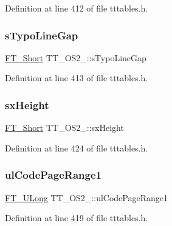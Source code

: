 Definition at line 412 of file tttables.\+h.

\mbox{\label{struct_t_t___o_s2___a55167834ee506be7c7208c5df7b5a91f}} 
\subsubsection{\texorpdfstring{sTypoLineGap}{sTypoLineGap}}
{\footnotesize\ttfamily \mbox{\hyperlink{fttypes_8h_aa7279be89046a2563cd3d4d6651fbdcf}{F\+T\+\_\+\+Short}} T\+T\+\_\+\+O\+S2\+\_\+\+::s\+Typo\+Line\+Gap}



Definition at line 413 of file tttables.\+h.

\mbox{\label{struct_t_t___o_s2___a2eb3bb1392461a536c393304bde72835}} 
\subsubsection{\texorpdfstring{sxHeight}{sxHeight}}
{\footnotesize\ttfamily \mbox{\hyperlink{fttypes_8h_aa7279be89046a2563cd3d4d6651fbdcf}{F\+T\+\_\+\+Short}} T\+T\+\_\+\+O\+S2\+\_\+\+::sx\+Height}



Definition at line 424 of file tttables.\+h.

\mbox{\label{struct_t_t___o_s2___a0b5a2875c21d20e5a5b5f3641ddb29fc}} 
\subsubsection{\texorpdfstring{ulCodePageRange1}{ulCodePageRange1}}
{\footnotesize\ttfamily \mbox{\hyperlink{fttypes_8h_a4fac88bdba78eb76b505efa6e4fbf3f5}{F\+T\+\_\+\+U\+Long}} T\+T\+\_\+\+O\+S2\+\_\+\+::ul\+Code\+Page\+Range1}



Definition at line 419 of file tttables.\+h.

\mbox{\label{struct_t_t___o_s2___ad117c64d73d15d1304c75fb5f41f1124}} 
